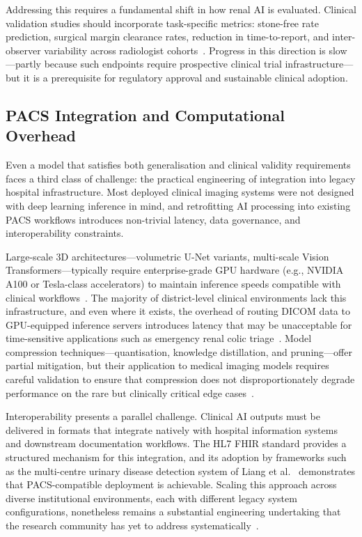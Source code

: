 Addressing this requires a fundamental shift in how renal AI is evaluated. Clinical validation studies should incorporate task-specific metrics: stone-free rate prediction, surgical margin clearance rates, reduction in time-to-report, and inter-observer variability across radiologist cohorts~\cite{noorelahi2025pacs}. Progress in this direction is slow---partly because such endpoints require prospective clinical trial infrastructure---but it is a prerequisite for regulatory approval and sustainable clinical adoption.

\subsection{PACS Integration and Computational Overhead}
\label{subsec:pacs_integration}

Even a model that satisfies both generalisation and clinical validity requirements faces a third class of challenge: the practical engineering of integration into legacy hospital infrastructure. Most deployed clinical imaging systems were not designed with deep learning inference in mind, and retrofitting AI processing into existing PACS workflows introduces non-trivial latency, data governance, and interoperability constraints.

Large-scale 3D architectures---volumetric U-Net variants, multi-scale Vision Transformers---typically require enterprise-grade GPU hardware (e.g., NVIDIA A100 or Tesla-class accelerators) to maintain inference speeds compatible with clinical workflows~\cite{azad2023daeformer, li2022automatic}. The majority of district-level clinical environments lack this infrastructure, and even where it exists, the overhead of routing DICOM data to GPU-equipped inference servers introduces latency that may be unacceptable for time-sensitive applications such as emergency renal colic triage~\cite{ye2026automated}. Model compression techniques---quantisation, knowledge distillation, and pruning---offer partial mitigation, but their application to medical imaging models requires careful validation to ensure that compression does not disproportionately degrade performance on the rare but clinically critical edge cases~\cite{kadhim2024machine}.

Interoperability presents a parallel challenge. Clinical AI outputs must be delivered in formats that integrate natively with hospital information systems and downstream documentation workflows. The HL7 FHIR standard provides a structured mechanism for this integration, and its adoption by frameworks such as the multi-centre urinary disease detection system of Liang et al.~\cite{liang2025multicenter} demonstrates that PACS-compatible deployment is achievable. Scaling this approach across diverse institutional environments, each with different legacy system configurations, nonetheless remains a substantial engineering undertaking that the research community has yet to address systematically~\cite{ali2024comprehensive}.

